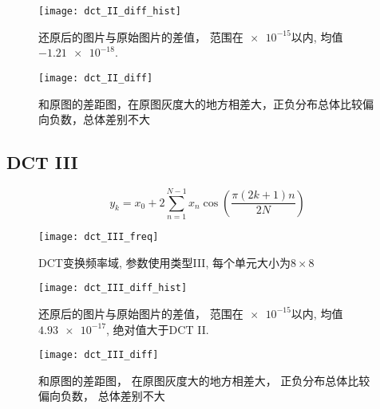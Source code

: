 \documentclass{myreport}
\begin{document}
    \begin{figure}[H]
      \centering
      \texttt{[image: dct\_II\_diff\_hist]}
      \caption{还原后的图片与原始图片的差值，
        范围在$\num{e-15}$以内,
        均值$\num{-1.21e-18}$.}
      \label{fig:dct_II_diff_hist}
    \end{figure}

    \begin{figure}[H]
      \centering
      \texttt{[image: dct\_II\_diff]}
      \caption{和原图的差距图，在原图灰度大的地方相差大，正负分布总体比较偏向负数，总体差别不大}
      \label{fig:dct_II_diff}
    \end{figure}
  \subsection{DCT III}
    \begin{equation}
      y_k = 
        x_0 
        + 2 \sum_{n=1}^{N-1} 
          x_n \cos\left(
            \frac{\pi(2k+1)n}{2N}
          \right)
    \end{equation}
    \begin{figure}[H]
      \centering
      \texttt{[image: dct\_III\_freq]}
      \caption{%
        DCT变换频率域,%
        参数使用类型III,%
        每个单元大小为$8 \times 8$%
      }
      \label{fig:dct_III_freq}
    \end{figure}

    \begin{figure}[H]
      \centering
      \texttt{[image: dct\_III\_diff\_hist]}
      \caption{还原后的图片与原始图片的差值，
        范围在$\num{e-15}$以内,
        均值$\num{4.93e-17}$,
        绝对值大于DCT II.}
      \label{fig:dct_II_diff_hist}
    \end{figure}

    \begin{figure}[H]
      \centering
      \texttt{[image: dct\_III\_diff]}
      \caption{和原图的差距图，
        在原图灰度大的地方相差大，
        正负分布总体比较偏向负数，
        总体差别不大}
      \label{fig:dct_III_diff}
    \end{figure}

    
\begin{appendices} %
  
  
\end{appendices}
\end{document}
